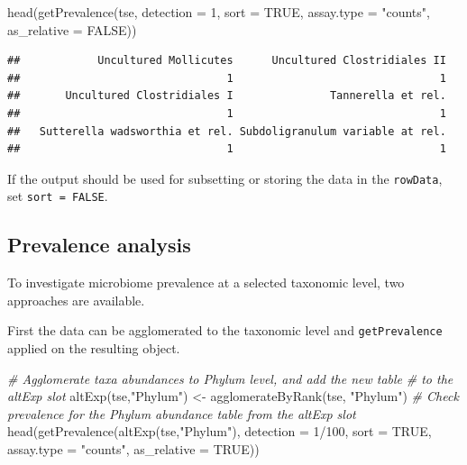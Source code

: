 \documentclass[
]{book}
\newenvironment{Shaded}{\begin{snugshade}}{\end{snugshade}}
\newcommand{\AttributeTok}[1]{\textcolor[rgb]{0.77,0.63,0.00}{#1}}
\newcommand{\CommentTok}[1]{\textcolor[rgb]{0.56,0.35,0.01}{\textit{#1}}}
\newcommand{\ConstantTok}[1]{\textcolor[rgb]{0.00,0.00,0.00}{#1}}
\newcommand{\DecValTok}[1]{\textcolor[rgb]{0.00,0.00,0.81}{#1}}
\newcommand{\FunctionTok}[1]{\textcolor[rgb]{0.00,0.00,0.00}{#1}}
\newcommand{\NormalTok}[1]{#1}
\newcommand{\OtherTok}[1]{\textcolor[rgb]{0.56,0.35,0.01}{#1}}
\newcommand{\SpecialCharTok}[1]{\textcolor[rgb]{0.00,0.00,0.00}{#1}}
\newcommand{\StringTok}[1]{\textcolor[rgb]{0.31,0.60,0.02}{#1}}
\begin{document}
\begin{Shaded}
\begin{Highlighting}[]
\FunctionTok{head}\NormalTok{(}\FunctionTok{getPrevalence}\NormalTok{(tse, }\AttributeTok{detection =} \DecValTok{1}\NormalTok{, }\AttributeTok{sort =} \ConstantTok{TRUE}\NormalTok{, }\AttributeTok{assay.type =} \StringTok{"counts"}\NormalTok{,}
                   \AttributeTok{as\_relative =} \ConstantTok{FALSE}\NormalTok{))}
\end{Highlighting}
\end{Shaded}

\begin{verbatim}
##            Uncultured Mollicutes      Uncultured Clostridiales II 
##                                1                                1 
##       Uncultured Clostridiales I               Tannerella et rel. 
##                                1                                1 
##   Sutterella wadsworthia et rel. Subdoligranulum variable at rel. 
##                                1                                1
\end{verbatim}

If the output should be used for subsetting or storing the data in the
\texttt{rowData}, set \texttt{sort\ =\ FALSE}.

\hypertarget{prevalence-analysis}{%
\subsection{Prevalence analysis}\label{prevalence-analysis}}

To investigate microbiome prevalence at a selected taxonomic level, two
approaches are available.

First the data can be agglomerated to the taxonomic level and \texttt{getPrevalence}
applied on the resulting object.

\begin{Shaded}
\begin{Highlighting}[]
\CommentTok{\# Agglomerate taxa abundances to Phylum level, and add the new table}
\CommentTok{\# to the altExp slot}
\FunctionTok{altExp}\NormalTok{(tse,}\StringTok{"Phylum"}\NormalTok{) }\OtherTok{\textless{}{-}} \FunctionTok{agglomerateByRank}\NormalTok{(tse, }\StringTok{"Phylum"}\NormalTok{)}
\CommentTok{\# Check prevalence for the Phylum abundance table from the altExp slot}
\FunctionTok{head}\NormalTok{(}\FunctionTok{getPrevalence}\NormalTok{(}\FunctionTok{altExp}\NormalTok{(tse,}\StringTok{"Phylum"}\NormalTok{), }\AttributeTok{detection =} \DecValTok{1}\SpecialCharTok{/}\DecValTok{100}\NormalTok{, }\AttributeTok{sort =} \ConstantTok{TRUE}\NormalTok{,}
                   \AttributeTok{assay.type =} \StringTok{"counts"}\NormalTok{, }\AttributeTok{as\_relative =} \ConstantTok{TRUE}\NormalTok{))}
\end{Highlighting}
\end{Shaded}
\end{document}

